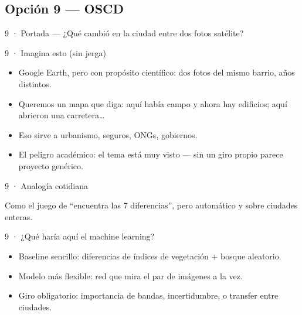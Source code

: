 \subsection{Opción 9 --- OSCD}

\begin{frame}{9 · Portada --- ¿Qué cambió en la ciudad entre dos fotos satélite?}
\end{frame}

\begin{frame}{9 · Imagina esto (sin jerga)}
  \begin{itemize}
    \item Google Earth, pero con propósito científico: dos fotos del mismo barrio, años distintos.
    \item Queremos un mapa que diga: aquí había campo y ahora hay edificios; aquí abrieron una carretera\ldots
    \item Eso sirve a urbanismo, seguros, ONGs, gobiernos.
    \item El peligro académico: el tema está muy visto --- sin un giro propio parece proyecto genérico.
  \end{itemize}
\end{frame}

\begin{frame}{9 · Analogía cotidiana}
  \begin{center}
  \end{center}
  \vspace{0.4em}
  Como el juego de ``encuentra las 7 diferencias'', pero automático y sobre ciudades enteras.
\end{frame}

\begin{frame}{9 · ¿Qué haría aquí el machine learning?}
  \begin{itemize}
    \item Baseline sencillo: diferencias de índices de vegetación + bosque aleatorio.
    \item Modelo más flexible: red que mira el par de imágenes a la vez.
    \item Giro obligatorio: importancia de bandas, incertidumbre, o transfer entre ciudades.
  \end{itemize}
\end{frame}

